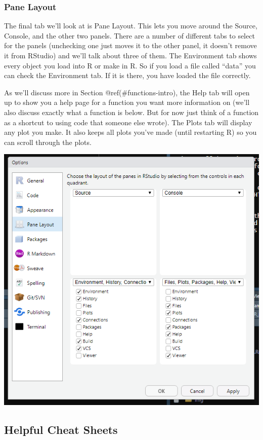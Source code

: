 \documentclass[
]{krantz}
\begin{document}
\hypertarget{pane-layout}{%
\subsubsection{Pane Layout}\label{pane-layout}}

The final tab we'll look at is Pane Layout. This lets you move around the Source, Console, and the other two panels. There are a number of different tabs to select for the panels (unchecking one just moves it to the other panel, it doesn't remove it from RStudio) and we'll talk about three of them. The Environment tab shows every object you load into R or make in R. So if you load a file called ``data'' you can check the Environment tab. If it is there, you have loaded the file correctly.

As we'll discuss more in Section @ref(\#functions-intro), the Help tab will open up to show you a help page for a function you want more information on (we'll also discuss exactly what a function is below. But for now just think of a function as a shortcut to using code that someone else wrote). The Plots tab will display any plot you make. It also keeps all plots you've made (until restarting R) so you can scroll through the plots.

\includegraphics{images/rstudio_9.PNG}

\hypertarget{helpful-cheat-sheets}{%
\subsection{Helpful Cheat Sheets}\label{helpful-cheat-sheets}}
\end{document}
